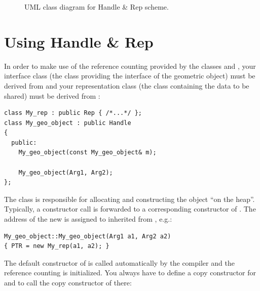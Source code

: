 \begin{figure}[ht]
\caption{UML class diagram for Handle \& Rep scheme.\label{fig:HandleRep}}
\end{figure}

\section{Using Handle \& Rep}
In order to make use of the reference counting provided by the
classes  and , your interface class (the class providing
the interface of the geometric object) must be derived from  and
your representation class (the class containing the data to be shared) must be 
derived from :

\begin{verbatim}
class My_rep : public Rep { /*...*/ };
class My_geo_object : public Handle 
{
  public:
    My_geo_object(const My_geo_object& m);

    My_geo_object(Arg1, Arg2);
};
\end{verbatim}

The class  is responsible for allocating and constructing
the  object ``on the heap''. 
Typically, a constructor call is forwarded to a
corresponding constructor of . The address of the new   is assigned to  inherited from , e.g.:

\begin{verbatim}
My_geo_object::My_geo_object(Arg1 a1, Arg2 a2)
{ PTR = new My_rep(a1, a2); }
\end{verbatim}

The default constructor of  is called automatically
by the compiler and the reference counting is initialized. 
You always have to define a copy constructor for  
and to call the copy constructor of  there:

